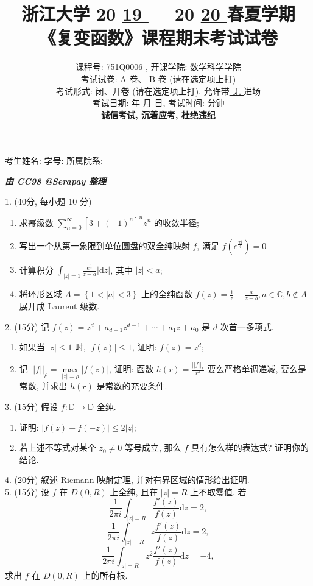 \documentclass[UTF8]{ctexart}
\title{
\textbf{浙江大学 }20 \underline{ 19 } — 20 \underline{ 20 } \textbf{春夏学期} \\
\textbf{《复变函数》课程期末考试试卷}
}
\author{
课程号: \underline{ \quad 751Q0006 \quad }, 开课学院: \underline{ \quad 数学科学学院 \quad } \\
考试试卷: \checkmark A 卷、 B 卷 (请在选定项上打\checkmark) \\
考试形式: \checkmark 闭、开卷 (请在选定项上打\checkmark), 允许带\underline{ \quad 无 \quad  }进场 \\
考试日期: \underline{ \quad 2020 \quad } 年 \underline{ \quad 06 \quad } 月 \underline{ \quad 23 \quad } 日, 考试时间: \underline{ \quad 120 \quad }分钟 \\
\textbf{诚信考试, 沉着应考, 杜绝违纪}
}
\date{}
\renewcommand{\d}{\text{d}}
\begin{document}
\maketitle

\begin{center}
考生姓名: \underline{\quad\quad\quad\quad\quad\quad\quad\quad\quad}  学号: \underline{\quad\quad\quad\quad\quad\quad\quad\quad\quad}  所属院系: \underline{\quad\quad\quad\quad\quad\quad\quad\quad\quad}
\end{center}

\centerline{\Large{\textbf{\textit{由 CC98 @Serapay 整理}}}}

1. (40分, 每小题 10 分)
\begin{enumerate}[(1)]
\item 求幂级数 $\displaystyle\sum_{n=0}^{\infty}\left[3+(-1)^n\right]^nz^n$ 的收敛半径;
\item 写出一个从第一象限到单位圆盘的双全纯映射 $f$, 满足 $\displaystyle f\left(e^{\frac{\pi i}{4}}\right)=0$
\item 计算积分 $\displaystyle\int_{|z|=1}\frac{e^{\frac{1}{z}}}{z-a}|\d z|$, 其中 $|z|<a$;
\item 将环形区域 $A=\left\{1<|a|<3\right\}$ 上的全纯函数 $\displaystyle f(z)=\frac{1}{z}-\frac{a}{z-b}, a\in\mathbb{C},b\notin A$ 展开成 Laurent 级数.\\
\end{enumerate}

2. (15分) 记 $f(z)=z^d+a_{d-1}z^{d-1}+\cdots+a_1z+a_0$ 是 $d$ 次首一多项式.
\begin{enumerate}[(1)]
  \item 如果当 $|z|\leq 1$ 时, $|f(z)|\leq 1$, 证明: $f(z)=z^d$;
  \item 记 $\displaystyle||f||_\rho=\max\limits_{|z|=\rho}|f(z)|$, 证明: 函数 $\displaystyle h(r)=\frac{||f||_r}{r^d}$ 要么严格单调递减, 要么是常数, 并求出 $h(r)$ 是常数的充要条件.\\
\end{enumerate}

3. (15分) 假设 $f:\mathbb{D}\rightarrow\mathbb{D}$ 全纯.
\begin{enumerate}[(1)]
  \item 证明: $|f(z)-f(-z)|\leq2|z|$;
  \item 若上述不等式对某个 $z_0\neq0$ 等号成立, 那么 $f$ 具有怎么样的表达式? 证明你的结论.\\
\end{enumerate}

4. (20分) 叙述 Riemann 映射定理, 并对有界区域的情形给出证明.
\\

5. (15分) 设 $f$ 在 $\overline{D(0,R)}$ 上全纯, 且在 ${|z|=R}$ 上不取零值. 若
\[
\frac{1}{2\pi i}\int_{|z|=R}\frac{f'(z)}{f(z)}\d z=2,
\]
\[
\frac{1}{2\pi i}\int_{|z|=R}z\frac{f'(z)}{f(z)}\d z=2,
\]
\[
\frac{1}{2\pi i}\int_{|z|=R}z^2\frac{f'(z)}{f(z)}\d z=-4,
\]
求出 $f$ 在 $D(0,R)$ 上的所有根.
\end{document}
